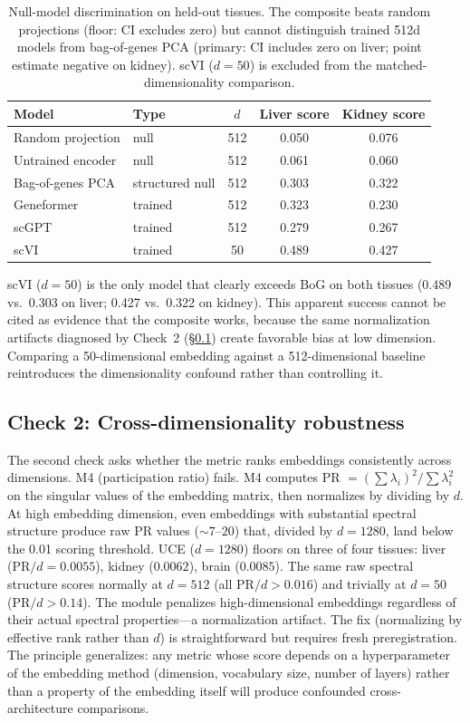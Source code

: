 \documentclass[10pt,letterpaper]{article}
\begin{document}
\begin{table}[t]
\centering
\caption{Null-model discrimination on held-out tissues. The composite beats random projections (floor: CI excludes zero) but cannot distinguish trained 512d models from bag-of-genes PCA (primary: CI includes zero on liver; point estimate negative on kidney). scVI ($d = 50$) is excluded from the matched-dimensionality comparison.}
\label{tab:v6b}
\small
\begin{tabular}{@{}llccc@{}}
\toprule
Model & Type & $d$ & Liver score & Kidney score \\
\midrule
Random projection & null & 512 & 0.050 & 0.076 \\
Untrained encoder & null & 512 & 0.061 & 0.060 \\
\midrule
Bag-of-genes PCA & structured null & 512 & 0.303 & 0.322 \\
\midrule
Geneformer & trained & 512 & 0.323 & 0.230 \\
scGPT & trained & 512 & 0.279 & 0.267 \\
scVI & trained & 50 & 0.489 & 0.427 \\
\bottomrule
\end{tabular}
\end{table}

scVI ($d = 50$) is the only model that clearly exceeds BoG on both tissues (0.489 vs.\ 0.303 on liver; 0.427 vs.\ 0.322 on kidney). This apparent success cannot be cited as evidence that the composite works, because the same normalization artifacts diagnosed by Check~2 (\S\ref{sec:check2}) create favorable bias at low dimension. Comparing a 50-dimensional embedding against a 512-dimensional baseline reintroduces the dimensionality confound rather than controlling it.

\subsection{Check 2: Cross-dimensionality robustness}
\label{sec:check2}

The second check asks whether the metric ranks embeddings consistently across dimensions. M4 (participation ratio) fails. M4 computes PR $= (\sum \lambda_i)^2 / \sum \lambda_i^2$ on the singular values of the embedding matrix, then normalizes by dividing by $d$. At high embedding dimension, even embeddings with substantial spectral structure produce raw PR values ($\sim 7$--$20$) that, divided by $d = 1280$, land below the 0.01 scoring threshold. UCE ($d = 1280$) floors on three of four tissues: liver (PR$/d = 0.0055$), kidney ($0.0062$), brain ($0.0085$). The same raw spectral structure scores normally at $d = 512$ (all PR$/d > 0.016$) and trivially at $d = 50$ (PR$/d > 0.14$). The module penalizes high-dimensional embeddings regardless of their actual spectral properties---a normalization artifact. The fix (normalizing by effective rank rather than $d$) is straightforward but requires fresh preregistration. The principle generalizes: any metric whose score depends on a hyperparameter of the embedding method (dimension, vocabulary size, number of layers) rather than a property of the embedding itself will produce confounded cross-architecture comparisons.
\end{document}
